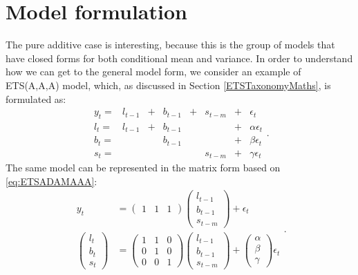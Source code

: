 \documentclass[]{book}
\theoremstyle{definition}
\theoremstyle{definition}
\theoremstyle{definition}
\theoremstyle{definition}
\theoremstyle{remark}
\begin{document}
\hypertarget{ADAMETSPureAdditive}{%
\section{Model formulation}\label{ADAMETSPureAdditive}}

The pure additive case is interesting, because this is the group of models that have closed forms for both conditional mean and variance. In order to understand how we can get to the general model form, we consider an example of ETS(A,A,A) model, which, as discussed in Section \ref{ETSTaxonomyMaths}, is formulated as:
\begin{equation}
  \begin{aligned}
    y_{t} = & l_{t-1} & + & b_{t-1} & + & s_{t-m} & + & \epsilon_t \\
    l_t = & l_{t-1} & + & b_{t-1} & & & + & \alpha \epsilon_t \\
    b_t = & & & b_{t-1} & & & + & \beta \epsilon_t \\
    s_t = & & & & & s_{t-m} & + & \gamma \epsilon_t 
  \end{aligned}.
  \label{eq:ETSADAMAAA}
\end{equation}
The same model can be represented in the matrix form based on \eqref{eq:ETSADAMAAA}:
\begin{equation}
  \begin{aligned}
    y_t & = \begin{pmatrix} 1 & 1 & 1 \end{pmatrix}
    \begin{pmatrix}
      l_{t-1} \\ b_{t-1} \\ s_{t-m}
    \end{pmatrix} +
    \epsilon_t \\
    \begin{pmatrix}
      l_t \\ b_t \\ s_t
    \end{pmatrix} & =
    \begin{pmatrix}
      1 & 1 & 0 \\ 0 & 1 & 0 \\ 0 & 0 & 1
    \end{pmatrix}
    \begin{pmatrix}
      l_{t-1} \\ b_{t-1} \\ s_{t-m}
    \end{pmatrix} +
    \begin{pmatrix}
      \alpha \\ \beta \\ \gamma
    \end{pmatrix}
    \epsilon_t 
  \end{aligned}.
  \label{eq:ETSADAMAAAMatrixForm}
\end{equation}
\end{document}
